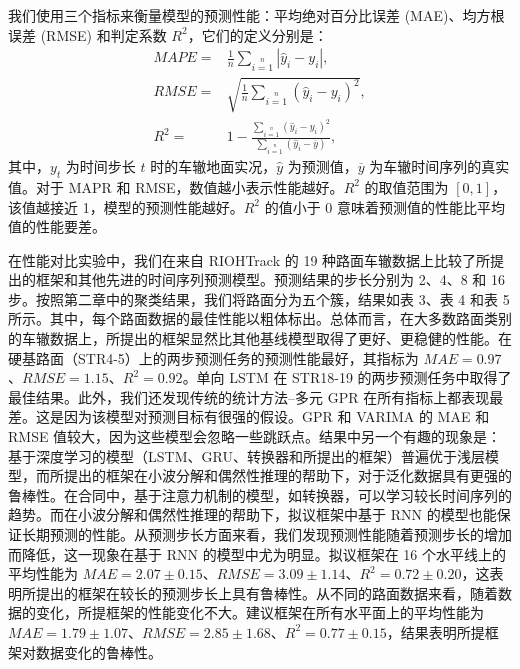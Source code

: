 我们使用三个指标来衡量模型的预测性能：平均绝对百分比误差 (MAE)、均方根误差 (RMSE) 和判定系数 $R^{2}$，它们的定义分别是：
\begin{align}
MAPE = &\frac{1}{n}\sum\limits_{i=1}\limits^{n}|\hat{y}_{i}-y_{i}|,\\
RMSE =& \sqrt{\frac{1}{n}\sum\limits_{i=1}\limits^{n}(\hat{y}_{i}-y_{i})^2},\\
R^{2} = &1-\frac{\sum\limits_{i=1}\limits^{n}(\hat{y}_{i}-y_{i})^2}{\sum\limits_{i=1}\limits^{n}(\hat{y}_{i}-\overline{y})},
\end{align}
其中，$y_{t}$ 为时间步长 $t$ 时的车辙地面实况，$\hat{y}$ 为预测值，$\overline{y}$ 为车辙时间序列的真实值。对于 MAPR 和 RMSE，数值越小表示性能越好。$R^{2}$ 的取值范围为 $[0,1]$，该值越接近 1，模型的预测性能越好。$R^{2}$ 的值小于 0 意味着预测值的性能比平均值的性能要差。

在性能对比实验中，我们在来自 RIOHTrack 的 19 种路面车辙数据上比较了所提出的框架和其他先进的时间序列预测模型。预测结果的步长分别为 2、4、8 和 16 步。按照第二章中的聚类结果，我们将路面分为五个簇，结果如表 3、表 4 和表 5 所示。其中，每个路面数据的最佳性能以粗体标出。总体而言，在大多数路面类别的车辙数据上，所提出的框架显然比其他基线模型取得了更好、更稳健的性能。在硬基路面（STR4-5）上的两步预测任务的预测性能最好，其指标为 $MAE=0.97$、$RMSE=1.15$、$R^{2}=0.92$。单向 LSTM 在 STR18-19 的两步预测任务中取得了最佳结果。此外，我们还发现传统的统计方法--多元 GPR 在所有指标上都表现最差。这是因为该模型对预测目标有很强的假设。GPR 和 VARIMA 的 MAE 和 RMSE 值较大，因为这些模型会忽略一些跳跃点。结果中另一个有趣的现象是：基于深度学习的模型（LSTM、GRU、转换器和所提出的框架）普遍优于浅层模型，而所提出的框架在小波分解和偶然性推理的帮助下，对于泛化数据具有更强的鲁棒性。在合同中，基于注意力机制的模型，如转换器，可以学习较长时间序列的趋势。而在小波分解和偶然性推理的帮助下，拟议框架中基于 RNN 的模型也能保证长期预测的性能。从预测步长方面来看，我们发现预测性能随着预测步长的增加而降低，这一现象在基于 RNN 的模型中尤为明显。拟议框架在 16 个水平线上的平均性能为 $MAE=2.07\pm0.15$、$RMSE=3.09\pm1.14$、$R^{2}=0.72\pm0.20$，这表明所提出的框架在较长的预测步长上具有鲁棒性。从不同的路面数据来看，随着数据的变化，所提框架的性能变化不大。建议框架在所有水平面上的平均性能为 $MAE=1.79\pm1.07$、$RMSE=2.85\pm1.68$、$R^{2}=0.77\pm0.15$，结果表明所提框架对数据变化的鲁棒性。

